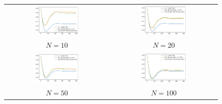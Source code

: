 \documentclass{amsart}
\begin{document}
\begin{figure}[ht]
  \begin{tabular}{cc}
    \includegraphics[width=0.45\textwidth]{SEIR_all_N10}
    &\includegraphics[width=0.45\textwidth]{SEIR_all_N20}\\
    $N=10$&$N=20$\\
    \includegraphics[width=0.45\textwidth]{SEIR_all_N50}
    &\includegraphics[width=0.45\textwidth]{SEIR_all_N100}\\
    $N=50$&$N=100$
  \end{tabular}

\end{figure}
\end{document}
